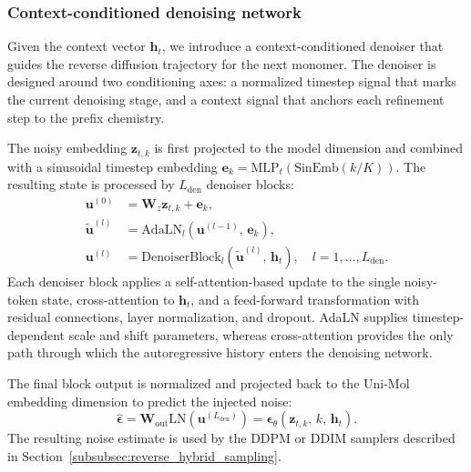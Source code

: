 \begin{methods}
\subsubsection{Context-conditioned denoising network}

Given the context vector $\mathbf{h}_t$, we introduce a context-conditioned denoiser that guides the reverse diffusion trajectory for the next monomer.
The denoiser is designed around two conditioning axes: a normalized timestep signal that marks the current denoising stage, and a context signal that anchors each refinement step to the prefix chemistry.

The noisy embedding $\mathbf{z}_{t,k}$ is first projected to the model dimension and combined with a sinusoidal timestep embedding $\mathbf{e}_k=\mathrm{MLP}_{t}(\mathrm{SinEmb}(k/K))$.
The resulting state is processed by $L_{\mathrm{den}}$ denoiser blocks:
\begin{equation}
\begin{aligned}
\mathbf{u}^{(0)} &= \mathbf{W}_{z}\mathbf{z}_{t,k} + \mathbf{e}_k,\\
\tilde{\mathbf{u}}^{(l)} &= \mathrm{AdaLN}_{l}\!\left(\mathbf{u}^{(l-1)},\, \mathbf{e}_k\right),\\
\mathbf{u}^{(l)} &= \mathrm{DenoiserBlock}_{l}\!\left(\tilde{\mathbf{u}}^{(l)},\, \mathbf{h}_t\right),\quad l=1,\ldots,L_{\mathrm{den}}.
\end{aligned}
\label{eq:denoiser_block}
\end{equation}
Each denoiser block applies a self-attention-based update to the single noisy-token state, cross-attention to $\mathbf{h}_t$, and a feed-forward transformation with residual connections, layer normalization, and dropout.
AdaLN supplies timestep-dependent scale and shift parameters, whereas cross-attention provides the only path through which the autoregressive history enters the denoising network.

The final block output is normalized and projected back to the Uni-Mol embedding dimension to predict the injected noise:
\begin{equation}
\hat{\boldsymbol{\epsilon}}
= \mathbf{W}_{\mathrm{out}}\mathrm{LN}\!\left(\mathbf{u}^{(L_{\mathrm{den}})}\right)
= \boldsymbol{\epsilon}_\theta(\mathbf{z}_{t,k},\, k,\, \mathbf{h}_t).
\label{eq:noise_prediction}
\end{equation}
The resulting noise estimate is used by the DDPM or DDIM samplers described in Section~\ref{subsubsec:reverse_hybrid_sampling}.



\end{methods}
